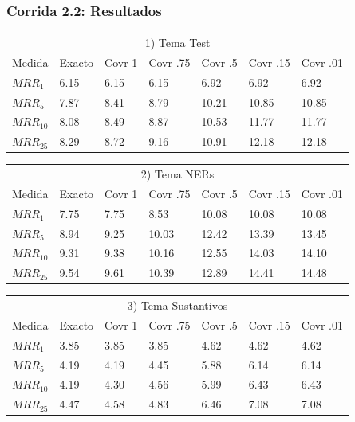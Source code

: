 \begin{frame}
\frametitle{Corrida 2.2: Resultados}

\begin{table}
\centering
\begin{center}
\begin{tabular}{|l | l | l | l | l | l | l |}

\multicolumn{7}{|c|}{1) Tema Test}  \\ 
Medida & Exacto & Covr 1 & Covr .75 & Covr .5 & Covr .15 & Covr .01 \\ 
$MRR_{1}$ & 6.15 & 6.15 & 6.15 & 6.92 & 6.92 & 6.92  \\ 
$MRR_{5}$ & 7.87 & 8.41 & 8.79 & 10.21 & 10.85 & 10.85  \\ 
$MRR_{10}$ & 8.08 & 8.49 & 8.87 & 10.53 & 11.77 & 11.77  \\ 
$MRR_{25}$ & 8.29 & 8.72 & 9.16 & 10.91 & 12.18 & 12.18  \\ 
\end{tabular}

\medskip

\begin{tabular}{|l | l | l | l | l | l | l |}

\multicolumn{7}{|c|}{2) Tema NERs}  \\ 
Medida & Exacto & Covr 1 & Covr .75 & Covr .5 & Covr .15 & Covr .01 \\ 
$MRR_{1}$ & 7.75 & 7.75 & 8.53 & 10.08 & 10.08 & 10.08  \\ 
$MRR_{5}$ & 8.94 & 9.25 & 10.03 & 12.42 & 13.39 & 13.45  \\ 
$MRR_{10}$ & 9.31 & 9.38 & 10.16 & 12.55 & 14.03 & 14.10  \\ 
$MRR_{25}$ & 9.54 & 9.61 & 10.39 & 12.89 & 14.41 & 14.48  \\ 
\end{tabular}

\medskip


\begin{tabular}{|l | l | l | l | l | l | l |}

\multicolumn{7}{|c|}{3) Tema Sustantivos}  \\ 
Medida & Exacto & Covr 1 & Covr .75 & Covr .5 & Covr .15 & Covr .01 \\ 
$MRR_{1}$ & 3.85 & 3.85 & 3.85 & 4.62 & 4.62 & 4.62  \\ 
$MRR_{5}$ & 4.19 & 4.19 & 4.45 & 5.88 & 6.14 & 6.14  \\ 
$MRR_{10}$ & 4.19 & 4.30 & 4.56 & 5.99 & 6.43 & 6.43  \\ 
$MRR_{25}$ & 4.47 & 4.58 & 4.83 & 6.46 & 7.08 & 7.08  \\ 
\end{tabular}


\end{center}
\end{table}
\end{frame}
